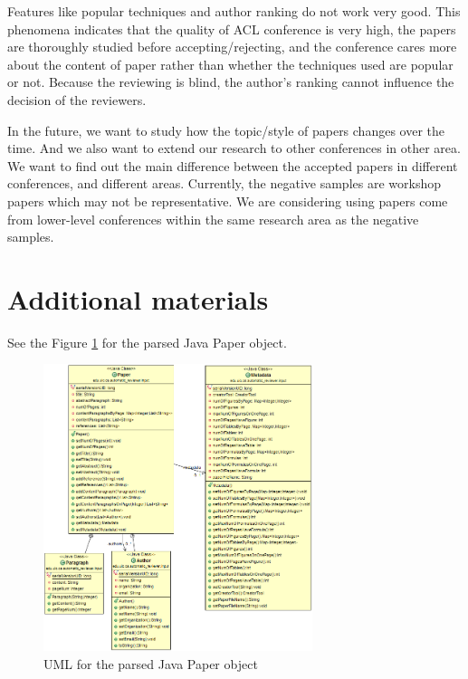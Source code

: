 \documentclass[11pt,letterpaper]{article}
\begin{document}
Features like popular techniques and author ranking do not work very good. 
This phenomena indicates that the quality of ACL conference is very high, the papers are thoroughly studied before accepting/rejecting, and the conference cares more about the content of paper rather than whether the techniques used are popular or not. 
Because the reviewing is blind, the author's ranking cannot influence the decision of the reviewers. 


In the future, we want to study how the topic/style of papers changes over the time. 
And we also want to extend our research to other conferences in other area.
We want to find out the main difference between the accepted papers in different conferences, and different areas. 
Currently, the negative samples are workshop papers which may not be representative. 
We are considering using papers come from lower-level conferences within the same research area as the negative samples. 

\appendix

\section{Additional materials}
See the Figure \ref{fig:uml} for the parsed Java Paper object.  
\begin{figure}[htb]
  \centering
	 	 \includegraphics[width=0.7\textwidth]{materials/paper_uml.png}
		\caption{UML for the parsed Java Paper object}
		\label{fig:uml}
\end{figure}
\end{document}
